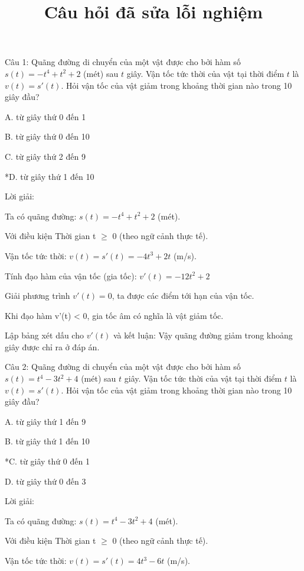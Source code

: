 \documentclass[a4paper,12pt]{article}
\begin{document}
\title{Câu hỏi đã sửa lỗi nghiệm}
\maketitle

Câu 1: Quãng đường di chuyển của một vật được cho bởi hàm số \(s(t) = -t^{4}+ t^{2}+ 2\) (mét) sau \(t\) giây. 
            Vận tốc tức thời của vật tại thời điểm \(t\) là \(v(t) = s'(t)\). 
            Hỏi vận tốc của vật giảm trong khoảng thời gian nào trong 10 giây đầu?

A. từ giây thứ 0 đến 1

B. từ giây thứ 0 đến 10

C. từ giây thứ 2 đến 9

*D. từ giây thứ 1 đến 10

Lời giải:

Ta có quãng đường: \(s(t) = -t^{4}+ t^{2}+ 2\) (mét).


Với điều kiện Thời gian t $\geq$ 0 (theo ngữ cảnh thực tế).

Vận tốc tức thời: \(v(t) = s'(t) = -4t^{3}+ 2t\) (m/s).

Tính đạo hàm của vận tốc (gia tốc):
\(v'(t) = -12t^{2}+ 2\)

Giải phương trình \(v'(t) = 0\), ta được các điểm tới hạn của vận tốc.



Khi đạo hàm v'(t) < 0, gia tốc âm có nghĩa là vật giảm tốc.

Lập bảng xét dấu cho \(v'(t)\) và kết luận: Vậy quãng đường giảm trong khoảng giây được chỉ ra ở đáp án.



Câu 2: Quãng đường di chuyển của một vật được cho bởi hàm số \(s(t) = t^{4}- 3t^{2}+ 4\) (mét) sau \(t\) giây. 
            Vận tốc tức thời của vật tại thời điểm \(t\) là \(v(t) = s'(t)\). 
            Hỏi vận tốc của vật giảm trong khoảng thời gian nào trong 10 giây đầu?

A. từ giây thứ 1 đến 9

B. từ giây thứ 1 đến 10

*C. từ giây thứ 0 đến 1

D. từ giây thứ 0 đến 3

Lời giải:

Ta có quãng đường: \(s(t) = t^{4}- 3t^{2}+ 4\) (mét).


Với điều kiện Thời gian t $\geq$ 0 (theo ngữ cảnh thực tế).

Vận tốc tức thời: \(v(t) = s'(t) = 4t^{3}- 6t\) (m/s).
\end{document}
